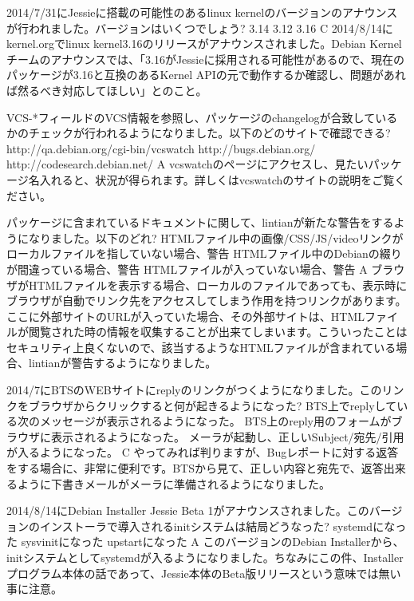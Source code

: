 \santaku
{2014/7/31にJessieに搭載の可能性のあるlinux kernelのバージョンのアナウンスが行われました。バージョンはいくつでしょう?}
{3.14}
{3.12}
{3.16}
{C}
{2014/8/14にkernel.orgでlinux kernel3.16のリリースがアナウンスされました。Debian Kernelチームのアナウンスでは、「3.16がJessieに採用される可能性があるので、現在のパッケージが3.16と互換のあるKernel APIの元で動作するか確認し、問題があれば然るべき対応してほしい」とのこと。}

\santaku
{VCS-*フィールドのVCS情報を参照し、パッケージのchangelogが合致しているかのチェックが行われるようになりました。以下のどのサイトで確認できる?}
{http://qa.debian.org/cgi-bin/vcswatch}
{http://bugs.debian.org/}
{http://codesearch.debian.net/}
{A}
{vcswatchのページにアクセスし、見たいパッケージ名入れると、状況が得られます。詳しくはvcswatchのサイトの説明をご覧ください。}

\santaku
{パッケージに含まれているドキュメントに関して、lintianが新たな警告をするようになりました。以下のどれ?}
{HTMLファイル中の画像/CSS/JS/videoリンクがローカルファイルを指していない場合、警告}
{HTMLファイル中のDebianの綴りが間違っている場合、警告}
{HTMLファイルが入っていない場合、警告}
{A}
{ブラウザがHTMLファイルを表示する場合、ローカルのファイルであっても、表示時にブラウザが自動でリンク先をアクセスしてしまう作用を持つリンクがあります。ここに外部サイトのURLが入っていた場合、その外部サイトは、HTMLファイルが閲覧された時の情報を収集することが出来てしまいます。こういったことはセキュリティ上良くないので、該当するようなHTMLファイルが含まれている場合、lintianが警告するようになりました。}

\santaku
{2014/7にBTSのWEBサイトにreplyのリンクがつくようになりました。このリンクをブラウザからクリックすると何が起きるようになった?}
{BTS上でreplyしている次のメッセージが表示されるようになった。}
{BTS上のreply用のフォームがブラウザに表示されるようになった。}
{メーラが起動し、正しいSubject/宛先/引用が入るようになった。}
{C}
{やってみれば判りますが、Bugレポートに対する返答をする場合に、非常に便利です。BTSから見て、正しい内容と宛先で、返答出来るように下書きメールがメーラに準備されるようになりました。}

\santaku
{2014/8/14にDebian Installer Jessie Beta 1がアナウンスされました。このバージョンのインストーラで導入されるinitシステムは結局どうなった?}
{systemdになった}
{sysvinitになった}
{upstartになった}
{A}
{このバージョンのDebian Installerから、initシステムとしてsystemdが入るようになりました。ちなみにこの件、Installerプログラム本体の話であって、Jessie本体のBeta版リリースという意味では無い事に注意。}




